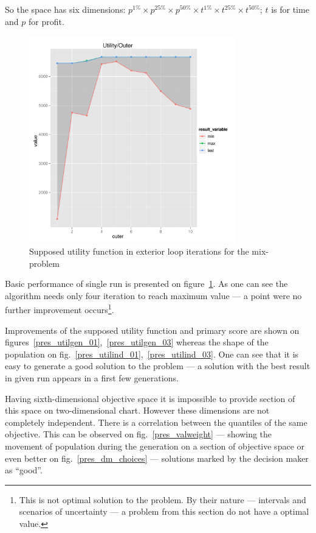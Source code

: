 So the space has six dimensions: $p^{1\%} \times p^{25\%} \times p^{50\%}
\times t^{1\%} \times t^{25\%} \times t^{50\%}$; $t$ is for time and $p$ for
profit.

\begin{figure}
  \centering
  \includegraphics[width=0.8\textwidth]{exp/uncert/pres_utilouter}
  \caption{Supposed utility function in exterior loop iterations for the
    mix-problem}
  \label{pres_utilouter}
\end{figure}

Basic performance of single run is presented on
figure~\ref{pres_utilouter}. As one can see the algorithm needs only four
iteration to reach maximum value --- a point were no further improvement
occurs\footnote{This is not optimal solution to the problem. By their nature
  --- intervals and scenarios of uncertainty --- a problem from this section
  do not have a optimal value.}.

Improvements of the supposed utility function and primary score are shown on
figures~\ref{pres_utilgen_01},~\ref{pres_utilgen_03} whereas the shape of the
population on fig.~\ref{pres_utilind_01},~\ref{pres_utilind_03}. One can see
that it is easy to generate a good solution to the problem --- a solution with
the best result in given run appears in a first few generations.

Having sixth-dimensional objective space it is impossible to provide section
of this space on two-dimensional chart. However these dimensions are not
completely independent. There is a correlation between the quantiles of the
same objective. This can be observed on fig.~\ref{pres_valweight} --- showing
the movement of population during the generation on a section of objective
space or even better on fig.~\ref{pres_dm_choices} --- solutions marked by the
decision maker as ``good''.


